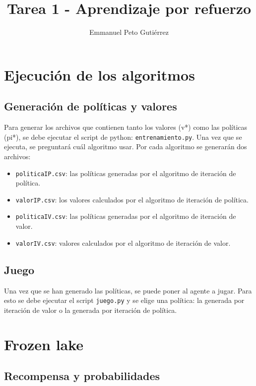 \documentclass{article}
\title{Tarea 1 - Aprendizaje por refuerzo}
\author{Emmanuel Peto Gutiérrez}
\begin{document}
\maketitle

\section{Ejecución de los algoritmos}

\subsection{Generación de políticas y valores}

Para generar los archivos que contienen tanto los valores (v*) como las políticas (pi*), se debe ejecutar el script de python: \texttt{entrenamiento.py}. Una vez que se ejecuta, se preguntará cuál algoritmo usar. Por cada algoritmo se generarán dos archivos:

\begin{itemize}
\item \texttt{politicaIP.csv}: las políticas generadas por el algoritmo de iteración de política.
\item \texttt{valorIP.csv}: los valores calculados por el algoritmo de iteración de política.
\item \texttt{politicaIV.csv}: las políticas generadas por el algoritmo de iteración de valor.
\item \texttt{valorIV.csv}: valores calculados por el algoritmo de iteración de valor.
\end{itemize}

\subsection{Juego}

Una vez que se han generado las políticas, se puede poner al agente a jugar. Para esto se debe ejecutar el script \texttt{juego.py} y se elige una política: la generada por iteración de valor o la generada por iteración de política.

\section{Frozen lake}

\subsection{Recompensa y probabilidades}
\end{document}
